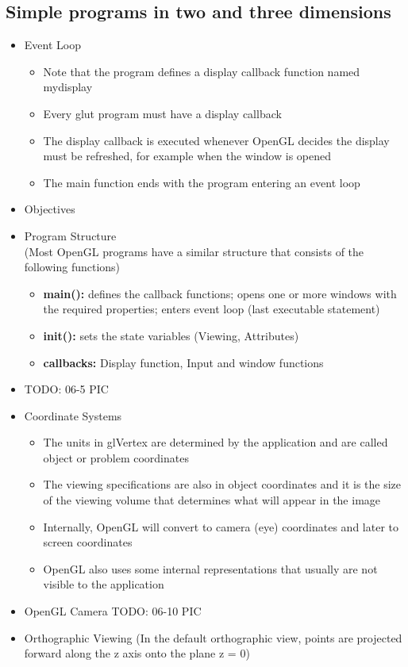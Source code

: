 \documentclass[11pt,a4paper]{article}
\begin{document}
	\subsection{Simple programs in two and three dimensions}
		\begin{itemize}
			\item  Event Loop
			\begin{itemize}
				\item Note that the program defines a display callback function named mydisplay
				\item Every glut program must have a display callback
				\item The display callback is executed whenever OpenGL decides the display must be refreshed, for example when the window is opened
				\item The main function ends with the program entering an event loop
			\end{itemize}
			\item Objectives
			\item Program Structure \\
				(Most OpenGL programs have a similar structure that consists of	the following functions)
				\begin{itemize}
					\item \textbf{main():} defines the callback functions; opens one or more windows with the required properties; enters event loop (last executable statement)	
					\item \textbf{init():} sets the state variables	(Viewing, Attributes)
					\item \textbf{callbacks:} Display function, Input and window functions
				\end{itemize}
			\item TODO: 06-5 PIC
			\item Coordinate Systems
				\begin{itemize}
					\item The units in glVertex are determined by the application and are called object or problem coordinates	
					\item The viewing specifications are also in object	coordinates and it is the size of the viewing volume that determines what will appear in the image	
					\item Internally, OpenGL will convert to camera (eye) coordinates and later to screen coordinates 	
					\item OpenGL also uses some internal representations that usually are not visible to the application
				\end{itemize}
			\item OpenGL Camera TODO: 06-10 PIC
			\item Orthographic Viewing (In the default orthographic view, points are projected forward along the z axis onto the plane z = 0)
		\end{itemize}
\end{document}
